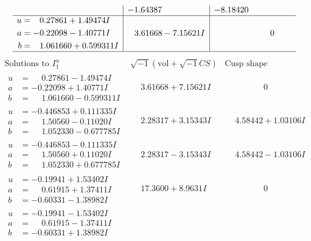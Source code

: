\documentclass[1p]{elsarticle_modified}
\theoremstyle{definition}
\newcommand{\I}{\sqrt{-1}}
\begin{document}
$$\begin{array}{c|c|c}
 & -1.64387\phantom{ +0.000000I} & -8.18420\phantom{ +0.000000I} \\ \hline\begin{aligned}
u &= \phantom{-}0.27861 + 1.49474 I \\
a &= -0.22098 - 1.40771 I \\
b &= \phantom{-}1.061660 + 0.599311 I\end{aligned}
 & \phantom{-}3.61668 - 7.15621 I & \phantom{-0.000000 } 0\\
 \hline 
 \end{array}$$\newpage$$\begin{array}{c|c|c}  
\text{Solutions to }I^u_{1}& \I (\text{vol} + \sqrt{-1}CS) & \text{Cusp shape}\\
 \hline 
\begin{aligned}
u &= \phantom{-}0.27861 - 1.49474 I \\
a &= -0.22098 + 1.40771 I \\
b &= \phantom{-}1.061660 - 0.599311 I\end{aligned}
 & \phantom{-}3.61668 + 7.15621 I & \phantom{-0.000000 } 0 \\ \hline\begin{aligned}
u &= -0.446853 + 0.111335 I \\
a &= \phantom{-}1.50560 - 0.11020 I \\
b &= \phantom{-}1.052330 - 0.677785 I\end{aligned}
 & \phantom{-}2.28317 + 3.15343 I & \phantom{-}4.58442 + 1.03106 I \\ \hline\begin{aligned}
u &= -0.446853 - 0.111335 I \\
a &= \phantom{-}1.50560 + 0.11020 I \\
b &= \phantom{-}1.052330 + 0.677785 I\end{aligned}
 & \phantom{-}2.28317 - 3.15343 I & \phantom{-}4.58442 - 1.03106 I \\ \hline\begin{aligned}
u &= -0.19941 + 1.53402 I \\
a &= \phantom{-}0.61915 + 1.37411 I \\
b &= -0.60331 - 1.38982 I\end{aligned}
 & \phantom{-}17.3600 + 8.9631 I & \phantom{-0.000000 } 0 \\ \hline\begin{aligned}
u &= -0.19941 - 1.53402 I \\
a &= \phantom{-}0.61915 - 1.37411 I \\
b &= -0.60331 + 1.38982 I\end{aligned}

\end{array}$$
\end{document}
